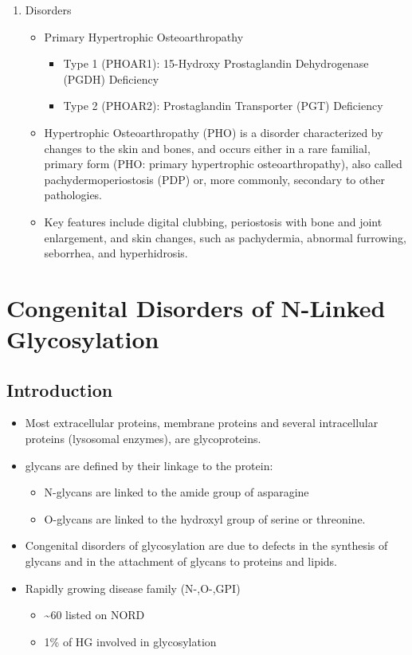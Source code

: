 \documentclass{scrartcl}
\begin{document}
\begin{enumerate}
\item Disorders
\label{sec:orgc37d033}
\begin{itemize}
\item Primary Hypertrophic Osteoarthropathy
\begin{itemize}
\item Type 1 (PHOAR1): 15-Hydroxy Prostaglandin Dehydrogenase (PGDH) Deficiency
\item Type 2 (PHOAR2): Prostaglandin Transporter (PGT) Deficiency
\end{itemize}

\item Hypertrophic Osteoarthropathy (PHO) is a disorder characterized by
changes to the skin and bones, and occurs either in a rare
familial, primary form (PHO: primary hypertrophic
osteoarthropathy), also called pachydermoperiostosis (PDP) or, more
commonly, secondary to other pathologies.

\item Key features include digital clubbing, periostosis with bone and
joint enlargement, and skin changes, such as pachydermia, abnormal
furrowing, seborrhea, and hyperhidrosis.
\end{itemize}
\end{enumerate}
\section{Congenital Disorders of N-Linked Glycosylation}
\label{sec:orgd8eeca6}
\subsection{Introduction}
\label{sec:orgbc58930}
\begin{itemize}
\item Most extracellular proteins, membrane proteins and several
intracellular proteins (lysosomal enzymes), are glycoproteins.

\item glycans are defined by their linkage to the protein:
\begin{itemize}
\item N-glycans are linked to the amide group of asparagine
\item O-glycans are linked to the hydroxyl group of serine or
threonine.
\end{itemize}

\item Congenital disorders of glycosylation are due to defects in the
synthesis of glycans and in the attachment of glycans to proteins
and lipids.
\item Rapidly growing disease family (N-,O-,GPI)
\begin{itemize}
\item \textasciitilde{}60 listed on NORD
\item 1\% of HG involved in glycosylation
\end{itemize}
\end{itemize}
\end{document}
